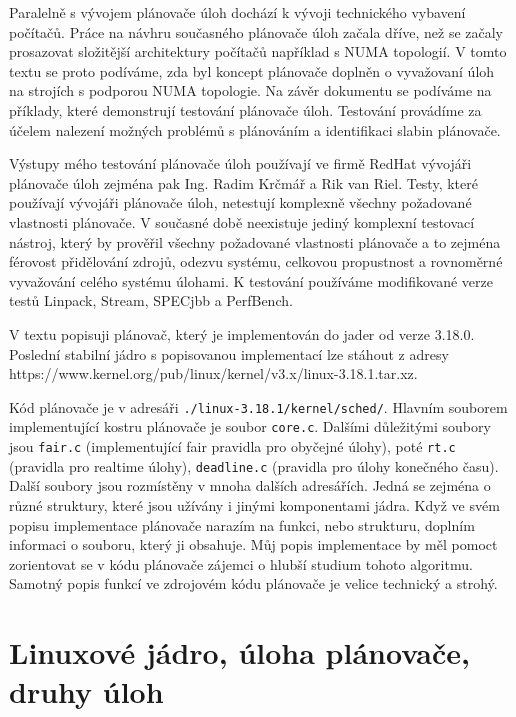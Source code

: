 \documentclass[
  master=true,
  font=sans,
  printversion=false,
  joinlists=true,
  figures=true,
  tables=true,
  sourcecodes=false,
  theorems=false,
  bibencoding=utf8,
  language=czech,
  encoding=utf8,
  field=ainfk,
  biblatex,
  glossaries,
  index
]{kidiplom}
\begin{document}
Paralelně s vývojem plánovače úloh dochází k vývoji technického vybavení počítačů. Práce na návhru současného plánovače úloh začala dříve, než se začaly prosazovat složitější architektury počítačů například s NUMA topologií. V tomto textu se proto podíváme, zda byl koncept plánovače doplněn o vyvažovaní úloh na strojích s podporou NUMA topologie. Na závěr dokumentu se podíváme na příklady, které demonstrují testování plánovače úloh. Testování provádíme za účelem nalezení možných problémů s plánováním a identifikaci slabin plánovače. 

Výstupy mého testování plánovače úloh používají ve firmě RedHat vývojáři plánovače úloh zejména pak Ing. Radim Krčmář a Rik van Riel. Testy, které používají vývojáři plánovače úloh, netestují komplexně všechny požadované vlastnosti plánovače. V současné době neexistuje jediný komplexní testovací nástroj, který by prověřil všechny požadované vlastnosti plánovače a to zejména férovost přidělování zdrojů, odezvu systému, celkovou propustnost a rovnoměrné vyvažování celého systému úlohami. K testování používáme modifikované verze testů Linpack, Stream, SPECjbb a PerfBench.

V textu popisuji plánovač, který je implementován do jader od verze 3.18.0. Poslední stabilní jádro s popisovanou implementací lze stáhout z adresy \linebreak https://www.kernel.org/pub/linux/kernel/v3.x/linux-3.18.1.tar.xz. 

Kód plánovače je v adresáři \verb#./linux-3.18.1/kernel/sched/#. Hlavním souborem implementující kostru plánovače je soubor \verb#core.c#. Dalšími důležitými soubory jsou \verb#fair.c# (implementující fair pravidla pro obyčejné úlohy), poté \verb#rt.c# (pravidla pro realtime úlohy), \verb#deadline.c# (pravidla pro úlohy konečného času). Další soubory jsou rozmístěny v mnoha dalších adresářích. Jedná se zejména o různé struktury, které jsou užívány i jinými komponentami jádra. Když ve svém popisu implementace plánovače narazím na funkci, nebo strukturu, doplním informaci o souboru, který ji obsahuje. Můj popis implementace by měl pomoct zorientovat se v kódu plánovače zájemci o hlubší studium tohoto algoritmu. Samotný popis funkcí ve zdrojovém kódu plánovače je velice technický a strohý.  

\section{Linuxové jádro, úloha plánovače, druhy úloh}
\end{document}
